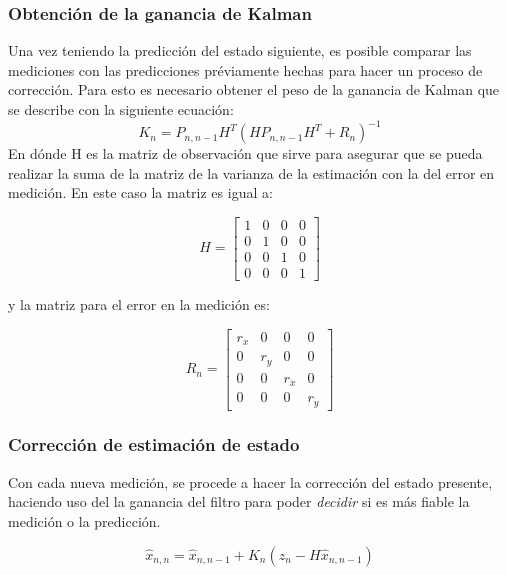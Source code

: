 		\subsubsection*{Obtención de la ganancia de Kalman}
	Una vez teniendo la predicción del estado siguiente, es posible comparar las mediciones con las predicciones préviamente hechas para hacer un proceso de corrección. Para esto es necesario obtener el peso de la ganancia de Kalman que se describe con la siguiente ecuación:
\begin{equation}
K_n = P_{n,n-1} H^T (H P_{n,n-1}H^T + R_n)^{-1}	
\end{equation}
	En dónde H es la matriz de observación que sirve para asegurar que se pueda realizar la suma de la matriz de la varianza de la estimación con la del error en medición. En este caso la matriz es igual a:
	
\begin{equation}
H = 
\begin{bmatrix}
1 & 0 & 0 & 0\\ 
0 & 1 & 0 & 0\\ 
0 & 0 & 1 & 0\\ 
0 & 0 & 0 & 1
\end{bmatrix}
\end{equation}
	
y la matriz para el error en la medición es:

\begin{equation}
R_n = 
\begin{bmatrix}
r_x & 0 & 0 & 0\\ 
0 & r_y & 0 & 0\\ 
0 & 0 & r_{\dot{x}} & 0\\ 
0 & 0 & 0 & r_{\dot{y}}
\end{bmatrix}
\label{matrix:measurement_error}
\end{equation}

		\subsubsection*{Corrección de estimación de estado}
	Con cada nueva medición, se procede a hacer la corrección del estado presente, haciendo uso del la ganancia del filtro para poder \textit{decidir} si es más fiable la medición o la predicción.

\begin{equation}
\hat{x}_{n,n} = \hat{x}_{n,n-1} + K_n(z_n - H \hat{x}_{n,n-1})
\end{equation}
	

